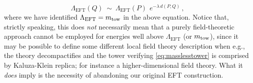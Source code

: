 %
\begin{equation}
\Lambda_{\text{EFT}}(Q)\ \sim \ \Lambda_{\text{EFT}}(P) \ \, e^{-\lambda\,  d(P,Q)}\, ,
\end{equation}
%
where we have identified $\Lambda_{\text{EFT}} = m_{\rm tow}$ in the above equation. Notice that, strictly speaking, this does \emph{not} necessarily mean that a purely field-theoretic approach cannot be employed for energies well above $\Lambda_{\text{EFT}}$ (or $m_{\rm tow}$), since it may be possible to define some different local field theory description when e.g., the theory decompactifies and the tower verifying \eqref{eq:masslesstower} is comprised by Kaluza-Klein replica; for instance a higher-dimensional field theory. What it \emph{does} imply is the necessity of abandoning our original EFT construction.

